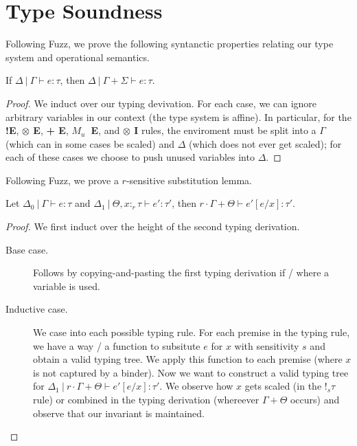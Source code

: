 \section{Type Soundness}
Following Fuzz, we prove the following syntanctic properties relating our type
system and operational semantics.

\begin{lemma}[Weakening]\label{thm:weakening}
  If $\Delta \ | \ \Gamma \vdash e : \tau$, then 
  $\Delta \ | \ \Gamma + \Sigma \vdash e : \tau$.
\end{lemma}
\begin{proof}
  We induct over our typing devivation. 
  For each case, we can ignore arbitrary variables in our context (the type
  system is affine). 
  In particular, for the \textbf{!E}, \textbf{$\otimes$ E}, \textbf{+ E},
  \textbf{$M_u$~E}, and \textbf{$\otimes$ I} rules, the enviroment must be split
  into a $\Gamma$ (which can in some cases be scaled) and $\Delta$ (which does
  not ever get scaled); for each of these cases we choose to push unused
  variables into $\Delta$. 
\end{proof}

Following Fuzz, we prove a $r$-sensitive substitution lemma.
\begin{lemma}\label{thm:substitution}
  Let $\Delta_0 \ | \ \Gamma \vdash e : \tau$ and 
  $\Delta_1 \ | \ \Theta, x :_r \tau \vdash e' : \tau'$, then 
  $r \cdot \Gamma + \Theta \vdash e'[e/x] : \tau'$.
\end{lemma}
\begin{proof}
  We first induct over the height of the second typing derivation. 
  \begin{description}
    \item[Base case.] Follows by copying-and-pasting the first typing derivation
      if / where a variable is used.
    \item[Inductive case.] We case into each possible typing rule. 
      For each premise in the typing rule, we have a way / a function to
      subsitute $e$ for $x$ with sensitivity $s$ and obtain a valid typing tree. 
      We apply this function to each premise (where $x$ is not captured by a
      binder). 
      Now we want to construct a valid typing tree for $\Delta_1 \ | \ r \cdot \Gamma + \Theta
      \vdash e'[e/x] : \tau'$. We observe how $x$ gets scaled (in the $!_s \tau$
      rule) or combined in the typing derivation (whereever $\Gamma + \Theta$
      occurs) and observe that our invariant is maintained.
  \end{description}
\end{proof}


